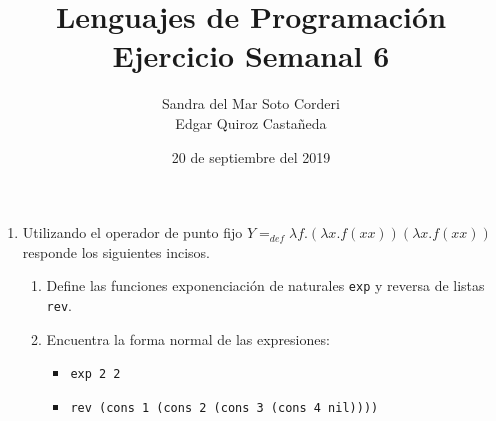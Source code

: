 \documentclass{article}
\begin{document}
    \title{
        Lenguajes de Programación \\
        Ejercicio Semanal 6
    }

    \author{
        Sandra del Mar Soto Corderi \\
        Edgar Quiroz Castañeda
    }

    \date{
        20 de septiembre del 2019
    }
    
    \maketitle

    \begin{enumerate}
        \item {
            Utilizando el operador de punto fijo $Y =_{def} \lambda f.(\lambda x.f(xx))(\lambda x.f(xx))$ responde los siguientes incisos.
            
            \begin{enumerate}
           
            	\item {
            	Define las funciones exponenciación de naturales \texttt{exp} y reversa de listas \texttt{rev}.\\       	
        		
        		}
        	
        	\item {
        		Encuentra la forma normal de las expresiones:
        		
        		\begin{itemize}
        			\item {
        			 \texttt{exp 2 2}
        			 
        			}
        		
        			\item {
        			\texttt{rev (cons 1 (cons 2 (cons 3 (cons 4 nil))))}
        			}
        		\end{itemize}
    		}
    	 \end{enumerate}
        }
    \end{enumerate}
\end{document}
